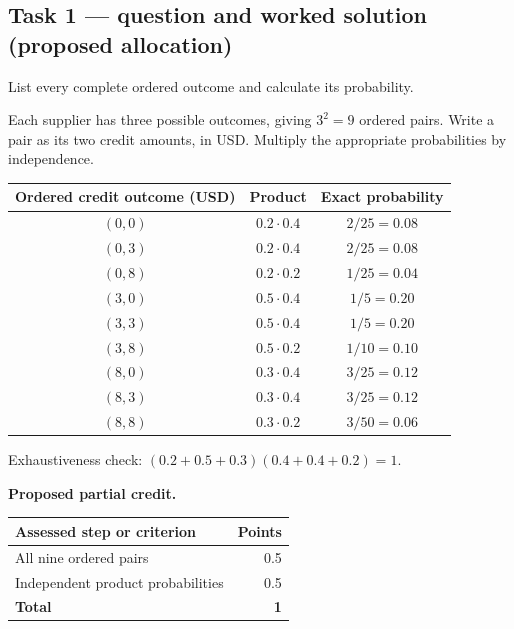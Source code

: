 \subsection*{Task 1 --- question and worked solution (proposed allocation) }
\label{sol:q2t1}

List every complete ordered outcome and calculate its probability.

Each supplier has three possible outcomes, giving $3^2=9$ ordered pairs. Write a pair as its two credit amounts, in USD. Multiply the appropriate probabilities by independence.

\begin{center}
\begin{tabular}{ccc}\toprule
Ordered credit outcome (USD) & Product & Exact probability\\\midrule
$(0,0)$ & $0.2\cdot0.4$ & $2/25=0.08$\\
$(0,3)$ & $0.2\cdot0.4$ & $2/25=0.08$\\
$(0,8)$ & $0.2\cdot0.2$ & $1/25=0.04$\\
$(3,0)$ & $0.5\cdot0.4$ & $1/5=0.20$\\
$(3,3)$ & $0.5\cdot0.4$ & $1/5=0.20$\\
$(3,8)$ & $0.5\cdot0.2$ & $1/10=0.10$\\
$(8,0)$ & $0.3\cdot0.4$ & $3/25=0.12$\\
$(8,3)$ & $0.3\cdot0.4$ & $3/25=0.12$\\
$(8,8)$ & $0.3\cdot0.2$ & $3/50=0.06$\\
\bottomrule\end{tabular}
\end{center}

Exhaustiveness check: $(0.2+0.5+0.3)(0.4+0.4+0.2)=1$.

\par\smallskip
\noindent\begin{minipage}{\linewidth}
\textbf{Proposed partial credit.}\par\smallskip
\begin{tabularx}{\linewidth}{@{}>{\raggedright\arraybackslash}X r@{}}\toprule
\textbf{Assessed step or criterion} & \textbf{Points}\\\midrule
All nine ordered pairs & 0.5\\
Independent product probabilities & 0.5\\
\midrule
\textbf{Total} & \textbf{1}\\
\bottomrule\end{tabularx}
\end{minipage}\par\smallskip

